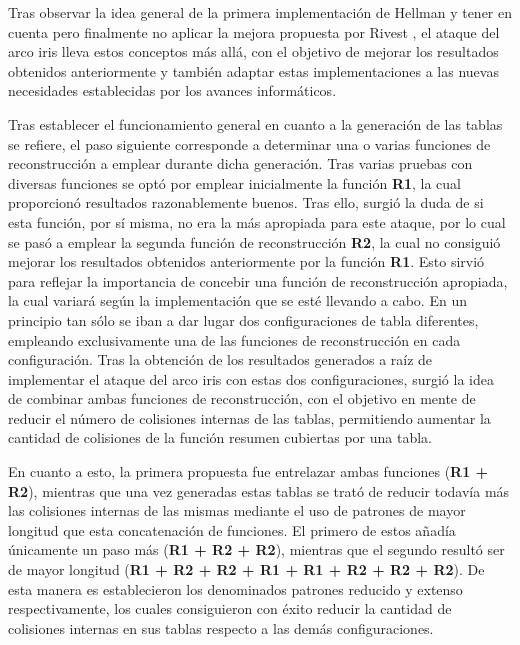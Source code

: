 \documentclass[12pt,spanish,listoffigures,listoftables,listofalgorithms]{tfgetsinf}
\begin{document}
Tras observar la idea general de la primera implementación de Hellman \cite{hellman} y tener en cuenta pero finalmente no aplicar la mejora propuesta por Rivest \cite{rivest}, el ataque del arco iris lleva estos conceptos más allá, con el objetivo de mejorar los resultados obtenidos anteriormente y también adaptar estas implementaciones a las nuevas necesidades establecidas por los avances informáticos.

Tras establecer el funcionamiento general en cuanto a la generación de las tablas se refiere, el paso siguiente corresponde a determinar una o varias funciones de reconstrucción a emplear durante dicha generación. Tras varias pruebas con diversas funciones se optó por emplear inicialmente la función \textbf{R1}, la cual proporcionó resultados razonablemente buenos. Tras ello, surgió la duda de si esta función, por sí misma, no era la más apropiada para este ataque, por lo cual se pasó a emplear la segunda función de reconstrucción \textbf{R2}, la cual no consiguió mejorar los resultados obtenidos anteriormente por la función \textbf{R1}. Esto sirvió para reflejar la importancia de concebir una función de reconstrucción apropiada, la cual variará según la implementación que se esté llevando a cabo. En un principio tan sólo se iban a dar lugar dos configuraciones de tabla diferentes, empleando exclusivamente una de las funciones de reconstrucción en cada configuración. Tras la obtención de los resultados generados a raíz de implementar el ataque del arco iris con estas dos configuraciones, surgió la idea de combinar ambas funciones de reconstrucción, con el objetivo en mente de reducir el número de colisiones internas de las tablas, permitiendo aumentar la cantidad de colisiones de la función resumen cubiertas por una tabla.

En cuanto a esto, la primera propuesta fue entrelazar ambas funciones (\textbf{R1 + R2}), mientras que una vez generadas estas tablas se trató de reducir todavía más las colisiones internas de las mismas mediante el uso de patrones de mayor longitud que esta concatenación de funciones. El primero de estos añadía únicamente un paso más (\textbf{R1 + R2 + R2}), mientras que el segundo resultó ser de mayor longitud (\textbf{R1 + R2 + R2 + R1 + R1 + R2 + R2 + R2}). De esta manera es establecieron los denominados patrones reducido y extenso respectivamente, los cuales consiguieron con éxito reducir la cantidad de colisiones internas en sus tablas respecto a las demás configuraciones.

\end{document}
